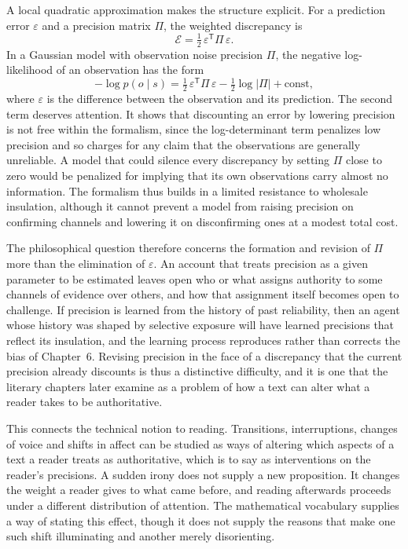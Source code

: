 A local quadratic approximation makes the structure explicit. For a prediction error $\varepsilon$ and a precision matrix $\Pi$, the weighted discrepancy is
\[
\mathcal{E} = \tfrac12\,\varepsilon^{\mathsf T}\Pi\,\varepsilon .
\]
In a Gaussian model with observation noise precision $\Pi$, the negative log-likelihood of an observation has the form
\[
-\log p(o\mid s) = \tfrac12\,\varepsilon^{\mathsf T}\Pi\,\varepsilon-\tfrac12\log\lvert\Pi\rvert+\text{const},
\]
where $\varepsilon$ is the difference between the observation and its prediction. The second term deserves attention. It shows that discounting an error by lowering precision is not free within the formalism, since the log-determinant term penalizes low precision and so charges for any claim that the observations are generally unreliable. A model that could silence every discrepancy by setting $\Pi$ close to zero would be penalized for implying that its own observations carry almost no information. The formalism thus builds in a limited resistance to wholesale insulation, although it cannot prevent a model from raising precision on confirming channels and lowering it on disconfirming ones at a modest total cost.

The philosophical question therefore concerns the formation and revision of $\Pi$ more than the elimination of $\varepsilon$. An account that treats precision as a given parameter to be estimated leaves open who or what assigns authority to some channels of evidence over others, and how that assignment itself becomes open to challenge. If precision is learned from the history of past reliability, then an agent whose history was shaped by selective exposure will have learned precisions that reflect its insulation, and the learning process reproduces rather than corrects the bias of Chapter~6. Revising precision in the face of a discrepancy that the current precision already discounts is thus a distinctive difficulty, and it is one that the literary chapters later examine as a problem of how a text can alter what a reader takes to be authoritative.

This connects the technical notion to reading. Transitions, interruptions, changes of voice and shifts in affect can be studied as ways of altering which aspects of a text a reader treats as authoritative, which is to say as interventions on the reader's precisions. A sudden irony does not supply a new proposition. It changes the weight a reader gives to what came before, and reading afterwards proceeds under a different distribution of attention. The mathematical vocabulary supplies a way of stating this effect, though it does not supply the reasons that make one such shift illuminating and another merely disorienting.

